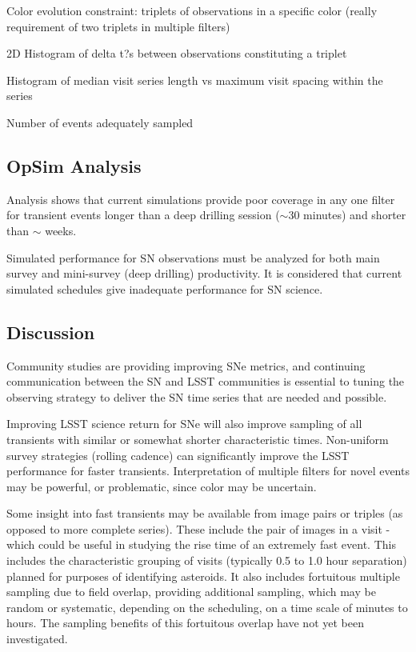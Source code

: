 Color evolution constraint: triplets of observations in a specific color (really requirement of two triplets in multiple filters)

  2D Histogram of delta t?s between observations constituting a triplet

Histogram of median visit series length vs maximum visit spacing within the series

Number of events adequately sampled


\subsection{OpSim Analysis}
\label{sec:\secname:analysis}

Analysis shows that current simulations provide  poor coverage in any one filter for transient events longer than a deep drilling session ($\sim$30 minutes) and shorter than $\sim$ weeks.

Simulated performance for SN observations must be analyzed for both main survey and mini-survey (deep drilling) productivity.  It is considered that current simulated schedules give inadequate performance for SN science.




\subsection{Discussion}
\label{sec:\secname:discussion}

Community studies are providing improving SNe metrics, and continuing communication between the SN and LSST communities is essential to tuning the observing strategy to deliver the SN time series that are needed and possible.

Improving LSST science return for SNe will also improve sampling of all transients with similar or somewhat shorter characteristic times.  Non-uniform survey strategies (rolling cadence) can significantly improve the LSST performance for faster transients.  Interpretation of multiple filters for novel events may be powerful, or problematic, since color may be uncertain.

Some insight into fast transients may be available from image pairs  or triples (as opposed to more complete series).  These include the pair of images in a visit - which could be useful in studying the rise time of an extremely fast event.  This includes the characteristic grouping of visits (typically 0.5 to 1.0 hour separation) planned for purposes of identifying asteroids.  It also includes fortuitous multiple sampling due to field overlap, providing additional sampling, which may be random or systematic, depending on the scheduling, on a time scale of minutes to hours.  The sampling benefits of this fortuitous overlap have not yet been investigated.


\navigationbar







